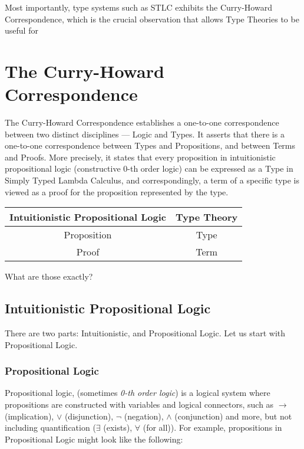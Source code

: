 Most importantly, type systems such as STLC exhibits the Curry-Howard Correspondence,
which is the crucial observation that allows Type Theories to be useful for

\section{The Curry-Howard Correspondence}

The Curry-Howard Correspondence establishes a one-to-one correspondence between
two distinct disciplines --- Logic and Types. It asserts that there is a
one-to-one correspondence between Types and Propositions, and between Terms and
Proofs. More precisely, it states that every proposition in intuitionistic
propositional logic (constructive 0-th order logic) can be expressed as a Type
in Simply Typed Lambda Calculus, and correspondingly, a term of a specific type
is viewed as a proof for the proposition represented by the type.

\begin{tabular}{c|c}
Intuitionistic Propositional Logic & Type Theory\\
\hline
Proposition & Type\\
Proof & Term
\end{tabular}

What are those exactly?

\subsection{Intuitionistic Propositional Logic}
There are two parts: Intuitionistic, and Propositional Logic. Let us start with
Propositional Logic.

\subsubsection{Propositional Logic} Propositional logic, (sometimes \emph{0-th
order logic}) is a logical system where propositions are constructed with
variables and logical connectors, such as $\to$ (implication), $\vee$
(disjunction), $\neg$ (negation), $\wedge$ (conjunction) and more, but not
including quantification ($\exists$ (exists), $\forall$ (for all)). For example,
propositions in Propositional Logic might look like the following:

